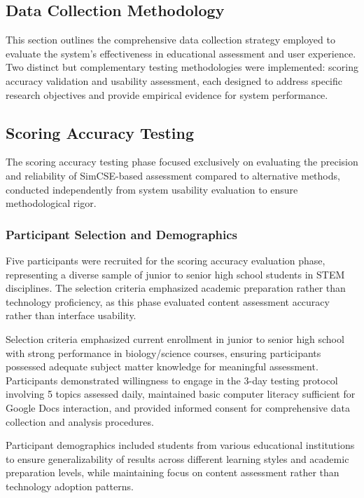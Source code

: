 {\color{maroon}
\subsection{Data Collection Methodology}

This section outlines the comprehensive data collection strategy employed to evaluate the system's effectiveness in educational assessment and user experience. Two distinct but complementary testing methodologies were implemented: scoring accuracy validation and usability assessment, each designed to address specific research objectives and provide empirical evidence for system performance.

{\color{maroon}
\subsection{Scoring Accuracy Testing}

The scoring accuracy testing phase focused exclusively on evaluating the precision and reliability of SimCSE-based assessment compared to alternative methods, conducted independently from system usability evaluation to ensure methodological rigor.

\subsubsection{Participant Selection and Demographics}

{\color{maroon}
Five participants were recruited for the scoring accuracy evaluation phase, representing a diverse sample of junior to senior high school students in STEM disciplines. The selection criteria emphasized academic preparation rather than technology proficiency, as this phase evaluated content assessment accuracy rather than interface usability.
}
}

{\color{maroon}
{\color{maroon}
Selection criteria emphasized current enrollment in junior to senior high school with strong performance in biology/science courses, ensuring participants possessed adequate subject matter knowledge for meaningful assessment. Participants demonstrated willingness to engage in the 3-day testing protocol involving 5 topics assessed daily, maintained basic computer literacy sufficient for Google Docs interaction, and provided informed consent for comprehensive data collection and analysis procedures.

Participant demographics included students from various educational institutions to ensure generalizability of results across different learning styles and academic preparation levels, while maintaining focus on content assessment rather than technology adoption patterns.
}
}

}
